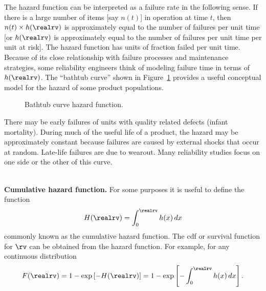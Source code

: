 The hazard function can be interpreted as a failure rate in the
following sense. If there is a large number of items [say $n(t)$] in
operation at time $t$, then $n(t) \times h(\realrv)$ is approximately equal to
the number of failures per unit time [or $h(\realrv)$ is
approximately equal to the number of failures per unit time per unit
at risk]. The hazard function has units of fraction failed per unit time.
Because of its close relationship with failure processes
and maintenance strategies, some reliability engineers think of
modeling failure time in terms of $h(\realrv)$.
The ``bathtub curve'' shown in Figure~\ref{figure:bathtubfig.ps} 
provides a useful
conceptual model for the hazard of some product populations. 
\begin{figure}
\caption{Bathtub curve hazard function.}
\label{figure:bathtubfig.ps}
\end{figure}
There may
be early failures of units with
quality related defects (infant mortality). 
During much of the useful life of a product, 
the hazard may be approximately constant because failures are caused by
external shocks that occur at random. Late-life failures are due to 
wearout. Many reliability studies focus on one side or the other
of this curve.

\mbox{  }\\
\noindent
{\bf Cumulative hazard function.}
For some purposes it is useful to define the function
\begin{displaymath} 
H(\realrv) = \int^{\realrv}_{0} h(x)\,dx
\end{displaymath} 
commonly known as the cumulative hazard function.
The cdf or survival function for $\rv$
can be obtained from the hazard function. For example, for 
any continuous distribution
\begin{equation} 
\label{equation:cum.haz.to.cdf}
F(\realrv)= 1-\exp \left [- H(\realrv)\right]  =1-\exp \left [-\int^{\realrv}_{0} h(x)\,dx \right] .
\end{equation} 

